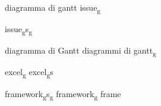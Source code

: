 diagramma di gantt
 issue\textsubscript{g}

 issue\textsubscript{g}s\textsubscript{g}

 diagramma di Gantt
 diagrammi di gantt\textsubscript{g}





 excel\textsubscript{g}
 excel\textsubscript{g}s

 framework\textsubscript{g}s\textsubscript{g}
 framework\textsubscript{g}
 frame